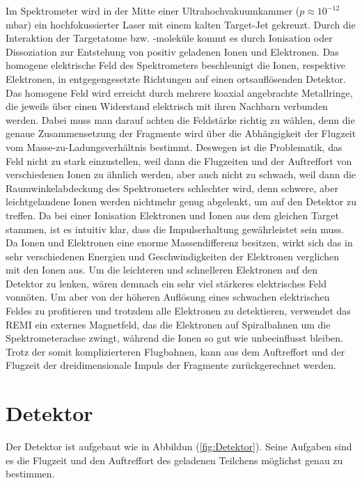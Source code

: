 Im Spektrometer wird in der Mitte einer Ultrahochvakuumkammer ($p \approx 10^{-12}$ mbar) ein hochfokussierter Laser mit einem kalten Target-Jet gekreuzt. Durch die Interaktion der Targetatome bzw. -moleküle kommt es durch Ionisation oder Dissoziation zur Entstehung von positiv geladenen Ionen und Elektronen. Das homogene elektrische Feld des Spektrometers beschleunigt die Ionen, respektive Elektronen, in entgegengesetzte Richtungen auf einen ortsauflösenden Detektor. Das homogene Feld wird erreicht durch mehrere koaxial angebrachte Metallringe, die jeweils über einen Widerstand elektrisch mit ihren Nachbarn verbunden werden. Dabei muss man darauf achten die Feldstärke richtig zu wählen, denn die genaue Zusammensetzung der Fragmente wird über die Abhängigkeit der Flugzeit vom Masse-zu-Ladungsverhältnis bestimmt. Deswegen ist die Problematik, das Feld nicht zu stark einzustellen, weil dann die Flugzeiten und der Auftreffort von verschiedenen Ionen zu ähnlich werden, aber auch nicht zu schwach, weil dann die Raumwinkelabdeckung des Spektrometers schlechter wird, denn schwere, aber leichtgelandene Ionen werden nichtmehr genug abgelenkt, um auf den Detektor zu treffen.
Da bei einer Ionisation Elektronen und Ionen aus dem gleichen Target stammen, ist es intuitiv klar, dass die Impulserhaltung gewährleistet sein muss. Da Ionen und Elektronen eine enorme Massendifferenz besitzen, wirkt sich das in sehr verschiedenen Energien und Geschwindigkeiten der Elektronen verglichen mit den Ionen aus. Um die leichteren und schnelleren Elektronen auf den Detektor zu lenken, wären demnach ein sehr viel stärkeres elektrisches Feld vonnöten. Um aber von der höheren Auflösung eines schwachen elektrischen Feldes zu profitieren und trotzdem alle Elektronen zu detektieren, verwendet das REMI ein externes Magnetfeld, das die Elektronen auf Spiralbahnen um die Spektrometerachse zwingt, während die Ionen so gut wie unbeeinflusst bleiben. Trotz der somit komplizierteren Flugbahnen, kann aus dem Auftreffort und der Flugzeit der dreidimensionale Impuls der Fragmente zurückgerechnet werden. 

\section{Detektor}

Der Detektor ist aufgebaut wie in Abbildun (\ref{fig:Detektor}). Seine Aufgaben sind es die Flugzeit und den Auftreffort des geladenen Teilchens möglichst genau zu bestimmen. 

